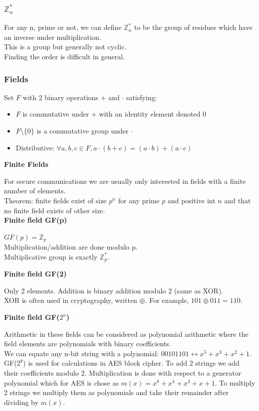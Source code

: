 \documentclass{article}
\begin{document}
\subsubsection{$\mathbb{Z}^*_n$}

For any n, prime or not, we can define $\mathbb{Z}^*_n$ to be the group of residues which have an inverse under multiplication.\\
This is a group but generally not cyclic.\\
Finding the order is difficult in general.

\subsubsection{Fields}

Set $F$ with 2 binary operations $+$ and $\cdot$ satisfying:
\begin{itemize}
    \item $F$ is commutative under $+$ with an identity element denoted $0$
    \item $F \setminus \{0\}$ is a commutative group under $\cdot$
    \item Distributive: $\forall a,b,c \in F, a\cdot (b+c)= (a \cdot b)+(a \cdot c)$
\end{itemize}

\textbf{Finite Fields}

For secure communications we are usually only interested in fields with a finite number of elements.\\
Theorem: finite fields exist of size $p^n$ for any prime $p$ and positive int $n$ and that no finite field exists of other size.\\

\textbf{Finite field GF(p)}

$GF(p) = \mathbb{Z}_p$\\
Multiplication/addition are done modulo p.\\
Multiplicative group is exactly $\mathbb{Z}^*_p$.

\textbf{Finite field GF(2)}

Only 2 elements. Addition is binary addition modulo 2 (same as XOR).\\
XOR is often used in cryptography, written $\oplus$. For example, $101 \oplus 011 = 110$.

\textbf{Finite field GF($2^n$)}

Arithmetic in these fields can be considered as polynomial arithmetic where the field elements are polynomials with binary coefficients.\\
We can equate any n-bit string with a polynomial: $00101101 \leftrightarrow x^5+x^3+x^2+1$.
GF($2^8$) is used for calculations in AES block cipher. To add 2 strings we add their coefficients modulo 2. Multiplication is done with respect to a generator polynomial which for AES is chose as $m(x)=x^8+x^4+x^3+x+1$. To multiply 2 strings we multiply them as polynomials and take their remainder after dividing by $m(x)$.
\end{document}
